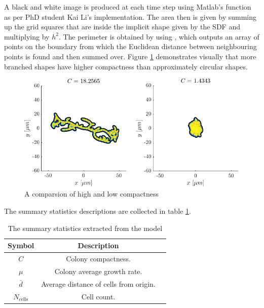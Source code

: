 A black and white image 
is produced at each time step using Matlab's function  as per
PhD student Kai Li's implementation. The area then is given by summing up the grid squares that are
inside the implicit shape given by the SDF and multiplying by $h^2$. The perimeter
is obtained by using , which outputs an array of points on the boundary
from which the Euclidean distance between neighbouring points is found and then summed over.
Figure \ref{fig:compactness_comparison} demonstrates visually that more branched shapes 
have higher compactness than approximately circular shapes.
\begin{figure}[!htb]
    \centering
    \includegraphics[width=\textwidth]{chapter2/figures/compareCompactness.pdf}
    \caption{A comparsion of high and low compactness}
    \label{fig:compactness_comparison}
\end{figure}
The summary statistics descriptions are collected in table \ref{table:summaryStats}.
\begin{table}[!htb]
\begin{center}
    \begin{tabular}{ |c|c|c| } 
     \hline
      \textbf{Symbol} & \textbf{Description} \\ 
      \hline
     $C$                 &  Colony compactness. \\ 
     $\mu$               & Colony average growth rate. \\ 
     $\bar{d}$           &   Average distance of cells from origin. \\ 
     $N_{\textrm{cells}}$ & Cell count. \\
     \hline   
    \end{tabular}   
\end{center}
\caption{The summary statistics extracted from the model}
\label{table:summaryStats}
\end{table}












